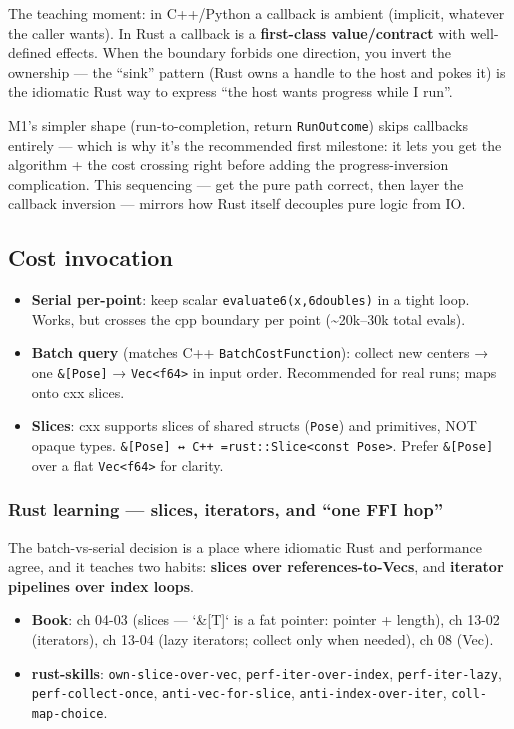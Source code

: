 \documentclass[11pt]{article}
\begin{document}
The teaching moment: in C++/Python a callback is ambient (implicit, whatever
the caller wants). In Rust a callback is a \textbf{first-class value/contract} with
well-defined effects. When the boundary forbids one direction, you invert the
ownership — the ``sink'' pattern (Rust owns a handle to the host and pokes it)
is the idiomatic Rust way to express ``the host wants progress while I run''.

M1's simpler shape (run-to-completion, return \texttt{RunOutcome}) skips callbacks
entirely — which is why it's the recommended first milestone: it lets you get
the algorithm + the cost crossing right before adding the progress-inversion
complication. This sequencing — get the pure path correct, then layer the
callback inversion — mirrors how Rust itself decouples pure logic from IO.
\subsection{Cost invocation}
\label{sec:org66a6360}

\begin{itemize}
\item \textbf{Serial per-point}: keep scalar \texttt{evaluate6(x,6doubles)} in a tight loop. Works,
but crosses the cpp boundary per point (\textasciitilde{}20k–30k total evals).
\item \textbf{Batch query} (matches C++ \texttt{BatchCostFunction}): collect new centers → one
\texttt{\&[Pose]} → \texttt{Vec<f64>} in input order. Recommended for real runs; maps onto
cxx slices.
\item \textbf{Slices}: cxx supports slices of shared structs (\texttt{Pose}) and primitives, NOT
opaque types. \texttt{\&[Pose] ↔ C++ =rust::Slice<const Pose>}. Prefer \texttt{\&[Pose]}
over a flat \texttt{Vec<f64>} for clarity.
\end{itemize}
\subsubsection{Rust learning — slices, iterators, and ``one FFI hop''}
\label{sec:org83d0c87}

The batch-vs-serial decision is a place where idiomatic Rust and performance
agree, and it teaches two habits: \textbf{\textbf{slices over references-to-Vecs}}, and
\textbf{\textbf{iterator pipelines over index loops}}.

\begin{itemize}
\item \textbf{\textbf{Book}}: ch 04-03 (slices — `\&[T]` is a fat pointer: pointer + length),
ch 13-02 (iterators), ch 13-04 (lazy iterators; collect only when needed),
ch 08 (Vec).
\item \textbf{\textbf{rust-skills}}: \texttt{own-slice-over-vec}, \texttt{perf-iter-over-index},
\texttt{perf-iter-lazy}, \texttt{perf-collect-once}, \texttt{anti-vec-for-slice},
\texttt{anti-index-over-iter}, \texttt{coll-map-choice}.
\end{itemize}
\end{document}
